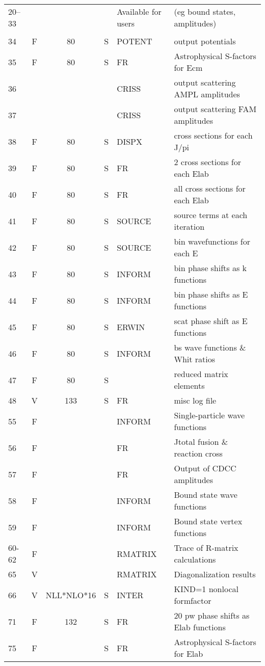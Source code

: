 \documentclass[11pt]{article}
\begin{document}
{\begin{tabular}{|l | c c c | l | l|}
20--33&    &            &    &     Available for users & (eg bound states, amplitudes)\\
     &  & & & &\\
34    &  F &    80      & S  &     POTENT &   output potentials\\
35    &  F &    80      & S  &     FR & Astrophysical S-factors for Ecm\\
36    &    &            &    &     CRISS & output scattering AMPL amplitudes\\
37    &    &            &    &     CRISS & output scattering FAM amplitudes\\
38    &  F &    80      & S  &     DISPX &    cross sections for each J/pi\\
39    &  F &    80      & S  &      FR   &    2 cross sections for each Elab\\
40    &  F &    80      & S  &      FR   &    all cross sections for each Elab\\
41    &  F &    80      & S  &     SOURCE &   source terms at each iteration\\
42    &  F &    80      & S  &     SOURCE &   bin wavefunctions for each E\\
43    &  F &    80      & S  &     INFORM &   bin phase shifts as k functions\\
44    &  F &    80      & S  &     INFORM &   bin phase shifts as E functions\\
45    &  F &    80      & S  &     ERWIN   &  scat phase shift as E functions\\
46    &  F &    80      & S  &     INFORM &   bs wave functions \& Whit ratios\\
47    &  F &    80      & S  &            &   reduced matrix elements \\
48    & V &   133      & S  &       FR  & misc log file\\
55    &   F &            &    &     INFORM & Single-particle wave functions\\
56    &   F &            &    &     FR & Jtotal fusion \& reaction cross\\
57    &   F &            &    &     FR & Output of CDCC amplitudes\\
58    &   F &            &    &     INFORM & Bound state wave functions \\
59    &   F &            &    &     INFORM & Bound state vertex functions \\
60-62 &   F &            &    &     RMATRIX & Trace of R-matrix calculations\\
65   & V &                 &  & RMATRIX & Diagonalization results \\
66    &  V  &NLL*NLO*16  & S  &     INTER & KIND=1 nonlocal formfactor\\
71    &   F &    132     & S  &     FR   &  20 pw phase shifts as Elab functions\\
75    &  F &            & S  &     FR & Astrophysical S-factors for Elab\\


\end{tabular}}
\end{document}
